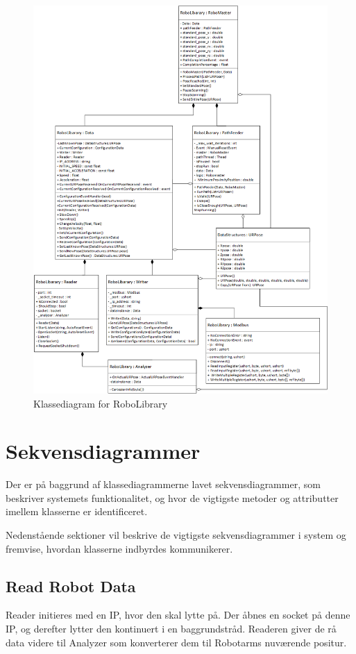 \begin{figure}[H]
    \centering
    \includegraphics[width=1\textwidth]{figurer/d/Design/Class/uml_class_robolibrary}
    \caption{Klassediagram for RoboLibrary}
    \label{class_RoboLib}
\end{figure}

\newpage
\section{Sekvensdiagrammer}
Der er på baggrund af klassediagrammerne lavet sekvensdiagrammer, som beskriver systemets funktionalitet, og hvor de vigtigste metoder og attributter imellem klasserne er identificeret.

Nedenstående sektioner vil beskrive de vigtigste sekvensdiagrammer i system og fremvise, hvordan klasserne indbyrdes kommunikerer. 

\subsection{Read Robot Data} 
Reader initieres med en IP, hvor den skal lytte på. 
Der åbnes en socket på denne IP, og derefter lytter den kontinuert i en baggrundstråd. 
Readeren giver de rå data videre til Analyzer som konverterer dem til Robotarms nuværende positur.

